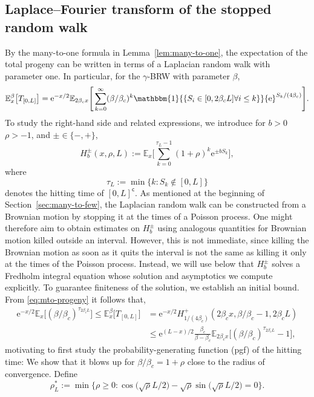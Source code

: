 \documentclass[a4paper, a4wide, 10pt, reqno]{amsart}
\theoremstyle{plain}
\theoremstyle{definition}
\numberwithin{equation}{section}
\newcommand{\E}{\mathbb E}
\newcommand{\re}{{\mathrm e}}
\newcommand{\Ind}[1]{\mathbbm{1}{\{#1\}}}
\renewcommand{\complement}{\mathsf{c}}
\begin{document}
\subsection{Laplace--Fourier transform of the stopped random walk}\label{sec:rw-progeny}
By the many-to-one formula in Lemma~\ref{lem:many-to-one}, the expectation of the total progeny can be written in terms of a Laplacian random walk with parameter one. In particular, for the $\gamma$-BRW with parameter $\beta$,
\begin{equation}\label{eq:mto-progeny}
\E_x^\beta\big[T_{[0, L]}\big] = \re^{-x/2}\E_{2\beta_cx}\Bigg[\sum_{k=0}^{\infty}(\beta/\beta_c)^k\Ind{S_i\in[0, 2\beta_cL]\forall i\le k}\re^{S_k/(4\beta_c)}\Bigg].
\end{equation}
To study the right-hand side and related expressions, we introduce for $b>0$ $\rho>-1$, and $\pm\in\{-, +\}$,
\begin{equation}\label{eq:h}
H_b^\pm(x, \rho, L):=\E_x\Bigg[\sum_{k=0}^{\tau_L-1}(1+\rho)^k\re^{\pm bS_k}\Bigg],
\end{equation}
where 
\begin{equation}\label{eq:hitting-time}
\tau_L:=\min\big\{k:S_k\notin[0,L]\big\}
\end{equation}
denotes the hitting time of $[0, L]^\complement$. As mentioned at the beginning of Section~\ref{sec:many-to-few}, the Laplacian random walk can be constructed from a Brownian motion by stopping it at the times of a Poisson process. One might therefore aim to obtain estimates on $H^\pm_b$ using analogous quantities for Brownian motion killed outside an interval. However, this is not immediate, since killing the Brownian motion as soon as it quits the interval is not the same as killing it only at the times of the Poisson process. Instead, we will use below that $H^\pm_b$ solves a Fredholm integral equation
whose solution and asymptotics we compute explicitly. To guarantee finiteness of the solution, we establish an initial bound.
From \eqref{eq:mto-progeny} it follows that, 
\begin{equation}\label{eq:progeny-pgf}
\begin{aligned}
\re^{-x/2}\E_x\Big[(\beta/\beta_c)^{\tau_{2\beta_cL}}\Big]\le \E_x^\beta\big[T_{[0, L]}\big]&=\re^{-x/2}H^+_{1/(4\beta_c)}(2\beta_cx,\beta/\beta_c-1, 2\beta_c L)\\ &\le \re^{(L-x)/2} \tfrac{\beta_c}{\beta-\beta_c}\E_{2\beta_cx}\Big[(\beta/\beta_c)^{\tau_{2\beta_cL}}-1\Big],\end{aligned}
\end{equation}
motivating to first study the probability-generating function (pgf) of the hitting time: We show that it blows up for $\beta/\beta_c=1+\rho$ close to the radius of convergence. 
Define
\begin{equation}\label{eq:sl}
\rho_L^* := \min\Big\{\rho\ge0: \cos\big(\sqrt{\rho}L/2\big) - \sqrt{\rho}\sin\big(\sqrt{\rho}L/2\big) =0\Big\}.
\end{equation}
\end{document}
